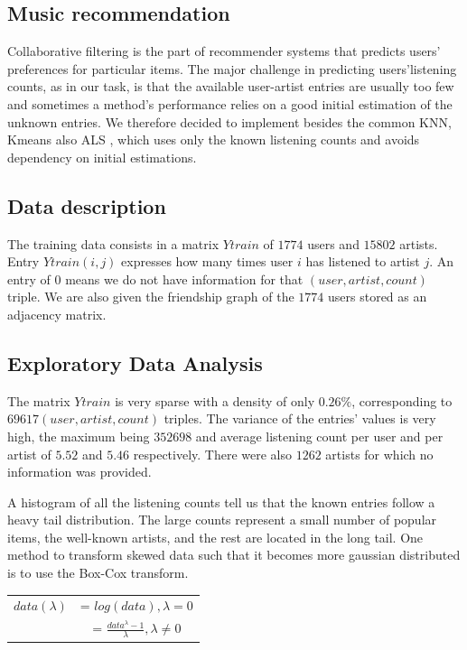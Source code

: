 \subsection{Music recommendation}
Collaborative filtering is the part of recommender systems that predicts users' preferences for particular items. The major challenge in predicting users'listening counts, as in our task, is that the available user-artist entries are usually too few and sometimes a method's performance relies on a good initial estimation of the unknown entries. 
We therefore decided to implement besides the common KNN, Kmeans also ALS \cite{Zhou:2008}, which uses only the known listening counts and avoids dependency on initial estimations.

\subsection{Data description}
The training data consists in a matrix $Ytrain$ of $1774$ users and $15802$ artists. Entry $Ytrain(i,j)$ expresses how many times user $i$ has listened to artist $j$. An entry of 0 means we do not have information for that $(user, artist, count)$ triple. We are also given the friendship graph of the $1774$ users stored as an adjacency matrix.

\subsection{Exploratory Data Analysis}

The matrix $Ytrain$ is very sparse with a density of only $0.26\%$, corresponding to $69617 (user, artist, count)$ triples. 
The variance of the entries' values is very high, the maximum  being $352698$ and average listening count per user and per artist of $5.52$ and $5.46$ respectively. There were also $1262$ artists for which no information was provided. \par \noindent A histogram of all the listening counts tell us that the known entries follow a heavy tail distribution. The large counts represent a small number of popular items, the well-known artists, and the rest are located in the long tail. One method to transform skewed data such that it becomes more gaussian distributed is to use the Box-Cox transform.
\\
\begin{table}[h]
  \centering
  \begin{tabular}{c  c }
  $data(\lambda)$&= $log(data), \lambda = 0$ \\ 
                            &= $\frac{data^\lambda - 1}{\lambda} ,\lambda \neq 0$ \\ 
  \end{tabular}
\end{table}

